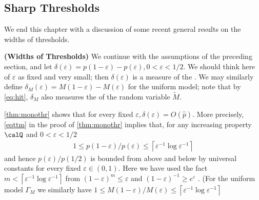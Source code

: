 \documentclass{article}
\newcommand{\bfs}[1]{\textbf{({#1}) }}
\begin{document}
\subsection{Sharp Thresholds}
We end this chapter with a discussion of some recent general results on the widths of thresholds. 
\begin{defa}{\bfs{Widths of Thresholds}}
We continue with the assumptions of the preceding section, and let $\delta(\varepsilon)=p(1-\varepsilon)-p(\varepsilon), 0<\varepsilon<1 / 2 .$ We should think here of $\varepsilon$
as fixed and very small; then $\delta(\varepsilon)$ is a measure of the . We may similarly define $\delta_{M}(\varepsilon)=M(1-\varepsilon)-M(\varepsilon)$ for the uniform model; note that by \cref{eq:hit}, $\delta_{M}$ also measures the  of the random variable $\widetilde{M}$.
\end{defa}
\begin{rema}
\cref{thm:monothr} shows that for every fixed $\varepsilon, \delta(\varepsilon)=O(\widehat{p}) .$ More precisely,\cref{eqttm} in the proof of \cref{thm:monothr} implies that, for any increasing property $\calQ$ and $0<\varepsilon<1 / 2$
\begin{align*}
1 \leq p(1-\varepsilon) / p(\varepsilon) \leq\left\lceil\varepsilon^{-1} \log \varepsilon^{-1}\right\rceil
\end{align*}
and hence $p(\varepsilon) / p(1 / 2)$ is bounded from above and below by universal constants for every fixed $\varepsilon \in(0,1) .$ Here we have used the fact $m<\left\lceil\varepsilon^{-1} \log \varepsilon^{-1}\right\rceil$ from $(1-\varepsilon)^m\le \varepsilon$ and $(1-\varepsilon)^{-1}\ge e^{\varepsilon}$ . (For the uniform model $\Gamma_{M}$ we similarly have $1 \leq M(1-\varepsilon) / M(\varepsilon) \leq\left\lceil\varepsilon^{-1} \log \varepsilon^{-1}\right\rceil$
\end{rema}
\end{document}
